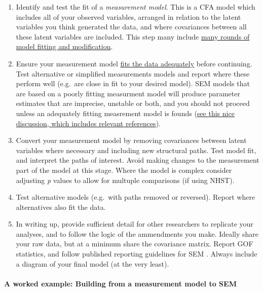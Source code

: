 \documentclass[]{article}
\let\oldparagraph\paragraph
\renewcommand{\paragraph}[1]{\oldparagraph{#1}\mbox{}}
\begin{document}
\begin{enumerate}
\def\labelenumi{\arabic{enumi}.}
\item
  Identify and test the fit of a \emph{measurement model}. This is a CFA model which
  includes all of your observed variables, arranged in relation to the latent
  variables you think generated the data, and where covariances between all
  these latent variables are included. This step many include
  \protect\hyperlink{model-improvement}{many rounds of model fitting and modification}.
\item
  Ensure your measurement model \protect\hyperlink{gof}{fits the data adequately} before
  continuing. Test alternative or simplified measurements models and report
  where these perform well (e.g.~are close in fit to your desired model). SEM
  models that are based on a poorly fitting measurment model will produce
  parameter estimates that are imprecise, unstable or both, and you should not
  proceed unless an adequately fitting measrement model is founds
  (\href{https://stats.stackexchange.com/a/143465/}{see this nice discussion, which includes relevant references}).
\item
  Convert your measurement model by removing covariances between latent
  variables where necessary and including new structural paths. Test model fit,
  and interpret the paths of interest. Avoid making changes to the measurement
  part of the model at this stage. Where the model is complex consider
  adjusting \emph{p} values to allow for multuple comparisons (if using NHST).
\item
  Test alternative models (e.g.~with paths removed or reversed). Report where
  alternatives also fit the data.
\item
  In writing up, provide sufficient detail for other researchers to replicate
  your analyses, and to follow the logic of the ammendments you make. Ideally
  share your raw data, but at a minimum share the covariance matrix. Report GOF
  statistics, and follow published reporting guidelines for SEM
  \citep{schreiber_reporting_2006}. Always include a diagram of your final model (at
  the very least).
\end{enumerate}

\hypertarget{a-worked-example-building-from-a-measurement-model-to-sem}{%
\paragraph{A worked example: Building from a measurement model to SEM}\label{a-worked-example-building-from-a-measurement-model-to-sem}}
\end{document}
